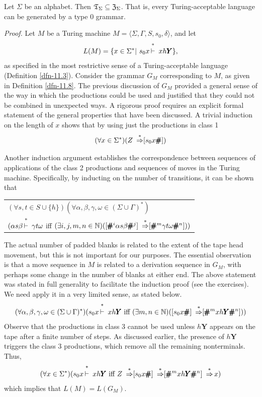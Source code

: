 \begin{thm}\label{thm-11.4}
Let $\Sigma$ be an alphabet. Then $\mathfrak{T}_\Sigma\subseteq\mathfrak{Z}_\Sigma$. That is, every
Turing-acceptable language can be generated by a type 0 grammar.

\emph{Proof.} Let $M$ be a Turing machine $M=\langle\Sigma,\Gamma,S,s_0,\delta
\rangle$, and let
\[ L(M) = \{x\in\Sigma^*|\ s_0x\Dvdash xh\pmb{Y}\}, \]
as specified in the most restrictive sense of a Turing-acceptable language
(Definition \ref{dfn-11.3}). Consider the grammar $G_M$ corresponding to $M$, as given in
Definition \ref{dfn-11.8}. The previous discussion of $G_M$ provided a general sense of the
way in which the productions could be used and justified that they could not be
combined in unexpected ways. A rigorous proof requires an explicit formal
statement of the general properties that have been discussed. A trivial
induction on the length of $x$ shows that by using just the productions in
class 1
	\[ (\forall x\in\Sigma^*)(Z\ \DRightarrow[s_0x\pmb{\#}]) \]

Another induction argument establishes the correspondence between sequences of
applications of the class 2 productions and sequences of moves in the Turing
machine. Specifically, by inducting on the number of transitions, it can be
shown that
\begin{center}\begin{tabular}{l}
$(\forall s,t\in S\cup\{h\})(\forall\alpha,\beta,\gamma,\omega\in(\Sigma\cup
	\Gamma)^*)$ \\
$(\alpha s\beta\Dvdash\gamma t\omega$ iff $(\exists i,j,m,n\in\mathbb{N})([\pmb{\#}^i
	\alpha s\beta\pmb{\#}^j]\ \operatorname{\overset{*}{\Rightarrow}}[\pmb{\#}^m\gamma t\omega\pmb{\#}
	^n]))$
\end{tabular}\end{center}
The actual number of padded blanks is related to the extent of the tape head
movement, but this is not important for our purposes. The essential observation
is that a move sequence in $M$ is related to a derivation sequence in $G_M$,
with perhaps some change in the number of blanks at either end. The above
statement was stated in full generality to facilitate the induction proof (see
the exercises). We need apply it in a very limited sense, as stated below.
\[ (\forall\alpha,\beta,\gamma,\omega\in(\Sigma\cup\Gamma)^*)(s_0x\Dvdash x
	h\pmb{Y}\text{ iff }(\exists m,n\in\NN)([s_0x\pmb{\#}]\ \DRightarrow
	[\pmb{\#}^mxh\pmb{Y\#}^n])) \]
Observe that the productions in class 3 cannot be used unless $h\pmb{Y}$ appears
on the tape after a finite number of steps. As discussed earlier, the presence
of $h\pmb{Y}$ triggers the class 3 productions, which remove all the remaining
nonterminals. Thus,
\[ (\forall x\in\Sigma^*)(s_0x\Dvdash xh\pmb{Y}\text{ iff }Z\ \DRightarrow[s_0x
	\pmb{\#}]\ \DRightarrow[\pmb{\#}^mxh\pmb{Y\#}^n]\ \DRightarrow x) \]
which implies that $L(M)=L(G_M)$.
\end{thm}

